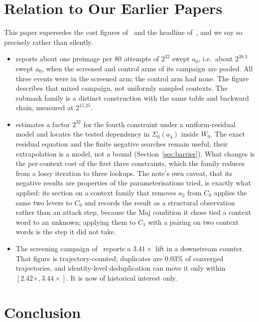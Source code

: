 \documentclass[11pt,a4paper]{article}
\newcommand{\Sig}[1]{\Sigma_{#1}}
\newcommand{\Maj}{\mathrm{Maj}}
\begin{document}
\section{Relation to Our Earlier Papers}
\label{sec:relation}

This paper supersedes the cost figures of~\cite{Basra2026R19} and the
headline of~\cite{Basra2026R20}, and we say so precisely rather than
silently.

\begin{itemize}
\item \cite{Basra2026R19} reports about one preimage per 80 attempts of $2^{32}$
  swept $a_0$, i.e.\ about $2^{38.3}$ swept $a_0$, when the screened and
  control arms of its campaign are pooled.  All three events were in the
  screened arm; the control arm had none.  The figure describes that mixed
  campaign, not uniformly sampled contexts.  The submask family is a distinct
  construction with the same table and backward chain, measured at
  $2^{15.25}$.
\item \cite{Basra2026R20} estimates a factor $2^{32}$ for the fourth
  constraint under a uniform-residual model and locates the tested
  dependency in $\Sig0(a_4)$ inside $W_9$.  The exact residual equation and
  the finite negative searches remain useful; their extrapolation is a model,
  not a bound (Section~\ref{sec:barrier}).  What changes
  is the per-context cost of the first three constraints, which the family
  reduces from a lossy iteration to three lookups.  The note's own caveat,
  that its negative results are properties of the parameterisations tried,
  is exactly what applied: its section on a context family that removes
  $a_2$ from $C_0$ applies the same two levers to $C_0$ and records the result
  as a structural observation rather than an attack step, because the $\Maj$
  condition it chose tied a context word to an unknown; applying them to $C_1$
  with a pairing on two context words is the step it did not take.
\item The screening campaign of~\cite{Basra2026R19} reports a $3.41\times$
  lift in a downstream counter.  That figure is trajectory-counted;
  duplicates are $0.03\%$ of converged trajectories, and identity-level deduplication can move it only
  within $[2.42\times,3.44\times]$.  It is now of historical interest only.
\end{itemize}

\section{Conclusion}
\label{sec:conclusion}
\end{document}
